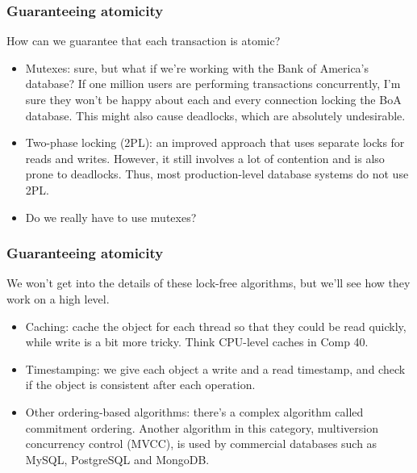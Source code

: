\documentclass{beamer}
\theoremstyle{plain}
\begin{document}
\begin{frame}
  \frametitle{Guaranteeing atomicity}
  How can we guarantee that each transaction is atomic?

  \pause
  
  \begin{itemize}
  \item Mutexes: sure, but what if we're working with the Bank of America's database? If one million
    users are performing transactions concurrently, I'm sure they won't be happy about each and every
    connection locking the BoA database. This might also cause deadlocks, which are absolutely undesirable.

    \pause

  \item Two-phase locking (2PL): an improved approach that uses separate locks for reads and writes. However,
    it still involves a lot of contention and is also prone to deadlocks. Thus, most
    production-level database systems do not use 2PL.

    \pause

  \item Do we really have to use mutexes?
  \end{itemize}
\end{frame}

\begin{frame}
  \frametitle{Guaranteeing atomicity}
  We won't get into the details of these lock-free algorithms, but we'll see how they work on a high level.
  \begin{itemize}
  \item Caching: cache the object for each thread so that they could be read quickly, while write is a bit
    more tricky. Think CPU-level caches in Comp 40.

    \pause
    
  \item Timestamping: we give each object a write and a read timestamp, and check if the object is consistent after each operation.

    \pause

  \item Other ordering-based algorithms: there's a complex algorithm called commitment ordering. Another algorithm in this
    category, multiversion concurrency control (MVCC), is used by commercial databases such as MySQL, PostgreSQL and MongoDB.
  \end{itemize}
\end{frame}
\end{document}
